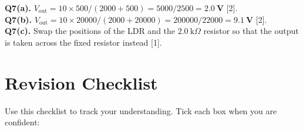 \begin{markscheme}
\vspace{0.5em}\textbf{Q7(a).} $V_{\text{out}} = 10 \times 500/(2000+500) = 5000/2500 = \mathbf{2.0\ \text{V}}$ [2].\\
\textbf{Q7(b).} $V_{\text{out}} = 10 \times 20000/(2000+20000) = 200000/22000 = \mathbf{9.1\ \text{V}}$ [2].\\
\textbf{Q7(c).} Swap the positions of the LDR and the $2.0\ \text{k}\Omega$ resistor so that the output is taken across the fixed resistor instead [1].

\end{markscheme}

\newpage
\section{Revision Checklist}

Use this checklist to track your understanding. Tick each box when you are confident:

